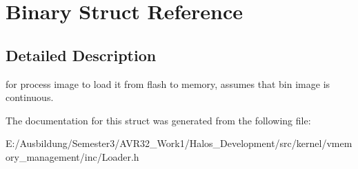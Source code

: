 \hypertarget{struct_binary}{
\section{Binary Struct Reference}
\label{struct_binary}
}


\subsection{Detailed Description}
for process image to load it from flash to memory, assumes that bin image is continuous. 

The documentation for this struct was generated from the following file:\begin{CompactItemize}
\item 
E:/Ausbildung/Semester3/AVR32\_\-Work1/Halos\_\-Development/src/kernel/vmemory\_\-management/inc/Loader.h\end{CompactItemize}

